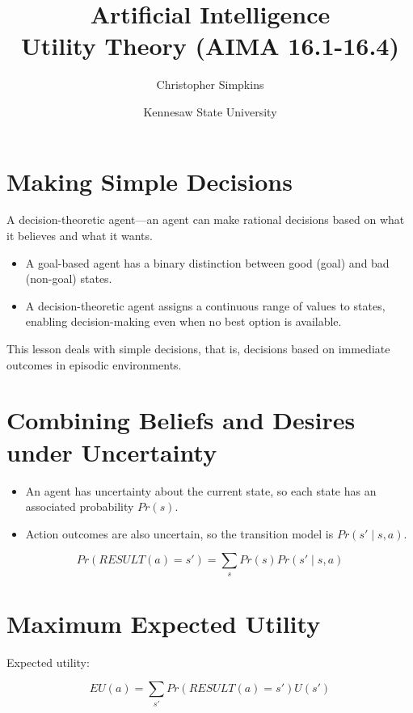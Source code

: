 \documentclass[11pt]{article}
\author{Christopher Simpkins}
\date{Kennesaw State University}
\title{Artificial Intelligence\\\medskip
\large Utility Theory (AIMA 16.1-16.4)}
\begin{document}
\maketitle
\section{Making Simple Decisions}
\label{sec:org6ac6797}

A decision-theoretic agent—an agent can make rational decisions based on what it believes and what it wants.

\begin{itemize}
\item A goal-based agent has a binary distinction between good (goal) and bad (non-goal) states.

\item A decision-theoretic agent assigns a continuous range of values to states, enabling decision-making even when no best option is available.
\end{itemize}

This lesson deals with simple decisions, that is, decisions based on immediate outcomes in episodic environments.
\section{Combining Beliefs and Desires under Uncertainty}
\label{sec:org416b194}

\begin{itemize}
\item An agent has uncertainty about the current state, so each state has an associated probability \(Pr(s)\).

\item Action outcomes are also uncertain, so the transition model is \(Pr(s' \mid s, a)\).
\end{itemize}

\begin{equation*}
Pr(RESULT(a) = s') = \sum_s Pr(s) Pr(s' \mid s, a)
\end{equation*}
\section{Maximum Expected Utility}
\label{sec:orgc7a0fd9}

Expected utility:

\begin{equation*}
EU(a) = \sum_{s'} Pr(RESULT(a) = s') U(s') \tag{16.1}
\end{equation*}
\end{document}
